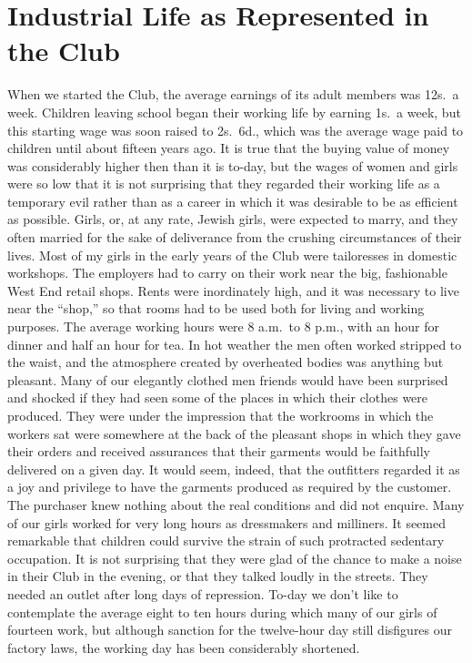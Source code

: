 \chapter[Industrial Life as Represented in the Club][Industry in the Club]{Industrial Life as Represented in the Club}

When we started the Club, the average earnings of its
adult members was 12s.\ a week. Children leaving school
began their working life by earning 1s.\ a week, but
this starting wage was soon raised to 2s.\ 6d., which was
the average wage paid to children until about fifteen
years ago. It is true that the buying value of money was
considerably higher then than it is to-day, but the wages
of women and girls were so low that it is not surprising
that they regarded their working life as a temporary evil
rather than as a career in which it was desirable to be as
efficient as possible. Girls, or, at any rate, Jewish girls,
were expected to marry, and they often married for the
sake of deliverance from the crushing circumstances of
their lives. Most of my girls in the early years of the Club
were tailoresses in domestic workshops. The employers
had to carry on their work near the big, fashionable West
End retail shops. Rents were inordinately high, and it
was necessary to live near the “shop,” so that rooms had
to be used both for living and working purposes. The
average working hours were 8 a.m.\ to 8 p.m., with an
hour for dinner and half an hour for tea. In hot weather
the men often worked stripped to the waist, and the
atmosphere created by overheated bodies was anything
but pleasant. Many of our elegantly clothed men friends
would have been surprised and shocked if they had seen
some of the places in which their clothes were produced.
They were under the impression that the workrooms in
which the workers sat were somewhere at the back of the
pleasant shops in which they gave their orders and
received assurances that their garments would be faithfully
delivered on a given day. It would seem, indeed, that the
outfitters regarded it as a joy and privilege to have the
garments produced as required by the customer. The
purchaser knew nothing about the real conditions and
did not enquire. Many of our girls worked for very long
hours as dressmakers and milliners. It seemed remarkable
that children could survive the strain of such
protracted sedentary occupation. It is not surprising that
they were glad of the chance to make a noise in their
Club in the evening, or that they talked loudly in the
streets. They needed an outlet after long days of repression.
To-day we don’t like to contemplate the average
eight to ten hours during which many of our girls of
fourteen work, but although sanction for the twelve-hour
day still disfigures our factory laws, the working day has
been considerably shortened.

